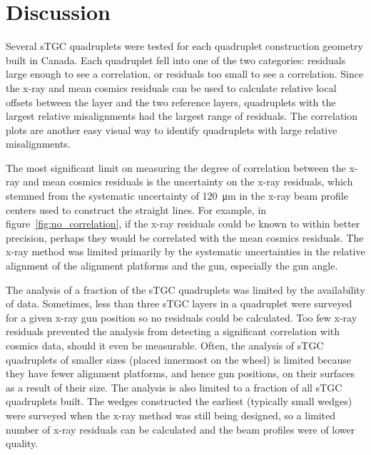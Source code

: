 \section{Discussion}

Several sTGC quadruplets were tested for each quadruplet construction geometry built in Canada. Each quadruplet fell into one of the two categories: residuals large enough to see a correlation, or residuals too small to see a correlation. Since the x-ray and mean cosmics residuals can be used to calculate relative local offsets between the layer and the two reference layers, quadruplets with the largest relative misalignments had the largest range of residuals. The correlation plots are another easy visual way to identify quadruplets with large relative misalignments.

The most significant limit on measuring the degree of correlation between the x-ray and mean cosmics residuals is the uncertainty on the x-ray residuals, which stemmed from the systematic uncertainty of \SI{120}{\micro\meter} in the x-ray beam profile centers used to construct the straight lines. For example, in figure~\ref{fig:no_correlation}, if the x-ray residuals could be known to within better precision, perhaps they would be correlated with the mean cosmics residuals. The x-ray method was limited primarily by the systematic uncertainties in the relative alignment of the alignment platforms and the gun, especially the gun angle.

The analysis of a fraction of the sTGC quadruplets was limited by the availability of data. Sometimes, less than three sTGC layers in a quadruplet were surveyed for a given x-ray gun position so no residuals could be calculated. Too few x-ray residuals prevented the analysis from detecting a significant correlation with cosmics data, should it even be measurable. Often, the analysis of sTGC quadruplets of smaller sizes (placed innermost on the wheel) is limited because they have fewer alignment platforms, and hence gun positions, on their surfaces as a result of their size. The analysis is also limited to a fraction of all sTGC quadruplets built. The wedges constructed the earliest (typically small wedges) were surveyed when the x-ray method was still being designed, so a limited number of x-ray residuals can be calculated and the beam profiles were of lower quality. 


